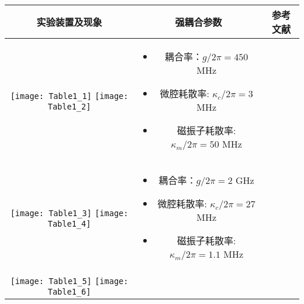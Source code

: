 \begin{center}
	\label{ExperimentsTable}
	\begin{tabular}{ccc}
		\toprule
		实验装置及现象 & 强耦合参数 & 参考文献 \\
		\midrule
		\begin{minipage}[m]{.3\textwidth}\centering\vspace*{5pt}
			\texttt{[image: Table1\_1]}
			\texttt{[image: Table1\_2]}\vspace*{5pt}
		\end{minipage} &
		\begin{minipage}[m]{.5\textwidth}
			\begin{itemize}
				\item 耦合率：$g/2\pi=450$ MHz
				\item 微腔耗散率: $\kappa_c /2\pi=3$ MHz
				\item 磁振子耗散率: $\kappa_m /2\pi=50$ MHz
			\end{itemize}
		\end{minipage} &
		\parencite{PhysRevLett.111.127003Huebl} \\
		\hline
		\begin{minipage}[m]{.3\textwidth}\centering\vspace*{5pt}
			\texttt{[image: Table1\_3]}
			\texttt{[image: Table1\_4]}\vspace*{5pt}
		\end{minipage} &
		\begin{minipage}[m]{.5\textwidth}
			\begin{itemize}
				\item 耦合率：$g/2\pi=2$ GHz
				\item 微腔耗散率: $\kappa_c /2\pi=27$ MHz
				\item 磁振子耗散率: $\kappa_m /2\pi=1.1$ MHz
			\end{itemize}
		\end{minipage} &
		\parencite{PhysRevApplied.2.054002Tobar} \\
		\hline
		\begin{minipage}[m]{.3\textwidth}\centering\vspace*{5pt}
			\quad\texttt{[image: Table1\_5]}
			\texttt{[image: Table1\_6]}\vspace*{5pt}
		\end{minipage} &

\end{tabular}
\end{center}

